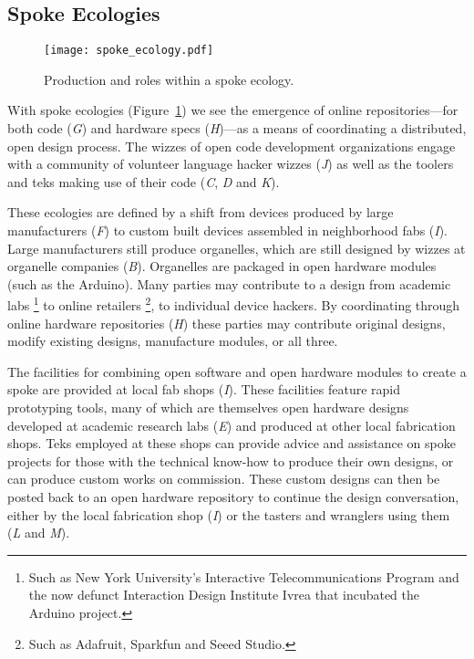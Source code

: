 \subsection{Spoke Ecologies}
%
\begin{figure}[b!]
  \centering
    \texttt{[image: spoke\_ecology.pdf]}
  \caption{Production and roles within a spoke ecology.}
  \label{fig:spoke_ecology}
\end{figure}
%
With spoke ecologies  (Figure~\ref{fig:spoke_ecology}) we see the emergence of online repositories---for both code (\emph{G}) and hardware specs (\emph{H})---as a means of coordinating a distributed, open design process. The wizzes of open code development organizations engage with a community of volunteer language hacker wizzes (\emph{J}) as well as the toolers and teks making use of their code (\emph{C}, \emph{D} and \emph{K}).

These ecologies are defined by a shift from devices produced by large manufacturers (\emph{F}) to custom built devices assembled in neighborhood fabs (\emph{I}). 
Large manufacturers still produce organelles, which are still designed by wizzes at organelle companies (\emph{B}). Organelles are packaged in open hardware modules (such as the Arduino). 
Many parties may contribute to a design from academic labs%
\footnote{Such as New York University's Interactive Telecommunications Program  and the now defunct Interaction Design Institute Ivrea that incubated the Arduino project.}
to online retailers%
\footnote{Such as Adafruit, Sparkfun and Seeed Studio.},
to individual device hackers.
By coordinating through online hardware repositories (\emph{H}) these parties may contribute original designs, modify existing designs, manufacture modules, or all three.

The facilities for combining open software and open hardware modules to create a spoke are provided at local fab shops (\emph{I}).
These facilities feature rapid prototyping tools, many of which are themselves open hardware designs developed at academic research labs (\emph{E}) and produced at other local fabrication shops.
Teks employed at these shops can provide advice and assistance on spoke projects for those with the technical know{}-how to produce their own designs, or can produce custom works on commission. 
These custom designs can then be posted back to an open hardware repository to continue the design conversation, either by the local fabrication shop (\emph{I}) or the tasters and wranglers using them (\emph{L} and \emph{M}).

